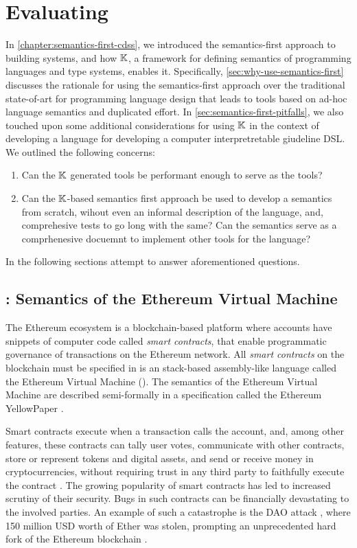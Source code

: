 \chapter{Evaluating \K{}}\label{chapter:evaluating-k}

In \autoref{chapter:semantics-first-cdss}, we introduced the
semantics-first approach to building systems, and how $\mathbb{K}$,
a framework for defining semantics of programming languages and
type systems, enables it. Specifically, \autoref{sec:why-use-semantics-first}
discusses the rationale for using the semantics-first approach over
the traditional state-of-art for programming language design that
leads to tools based on ad-hoc language semantics and duplicated effort.
In \autoref{sec:semantics-first-pitfalls}, we also touched upon
some additional considerations for using $\mathbb{K}$ in the context of
developing a language for developing a computer interpretretable giudeline DSL.
We outlined the following concerns:
\begin{enumerate}[label=(Q\arabic*)]
 \item Can the $\mathbb{K}$ generated tools be performant enough to serve as
 the  tools?
 \item Can the $\mathbb{K}$-based semantics first approach be used to develop
 a semantics from scratch, wihout even an informal description of the language,
  and, comprehesive tests to go long with the same? Can the semantics
  serve as a comprhenesive docuemnt to implement other tools for the language?
\end{enumerate}

In the following sections attempt to answer aforementioned questions.

\section{\KEVM: Semantics of the Ethereum Virtual Machine}\label{sec:kevm}

The Ethereum ecosystem is a blockchain-based platform where accounts
have snippets of computer code called \emph{smart contracts}, that
enable programmatic governance of transactions on the Ethereum network.
All \emph{smart contracts} on the blockchain
must be specified in is an stack-based assembly-like language called
the Ethereum Virtual Machine (\EVM{}). The semantics of the
Ethereum Virtual Machine are described semi-formally in a specification
called the Ethereum YellowPaper \cite{WoodReport14}.

Smart contracts execute when a transaction calls the account, and, among other features,
these contracts can tally user votes, communicate with other contracts,
store or represent tokens and digital assets, and send or receive money in
cryptocurrencies, without requiring trust in any third party to faithfully
execute the contract \cite{SzaboReport94,PetersBook16}.
The growing popularity of smart contracts has led to increased scrutiny of their security.
Bugs in such contracts can be financially devastating to the involved parties.
An example of such a catastrophe is the DAO attack \cite{delCastilloReport16},
 where 150 million USD worth of Ether was stolen,
 prompting an unprecedented hard fork of the Ethereum blockchain
 \cite{DaianReport16}.

